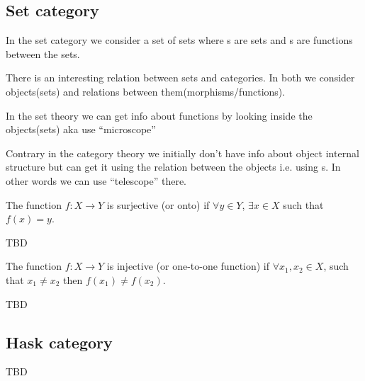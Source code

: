 \subsection{\textbf{Set} category}
\begin{example}
\label{ex:setcategory}
In the set category we consider a set of sets where
s are sets and s are
functions between the sets. 
\end{example}

\begin{remark}
\label{rem:set_vs_category}
There is an interesting relation between sets and categories. In both
we consider objects(sets) and relations between
them(morphisms/functions). 

In the set theory we can get info about functions by looking inside
the objects(sets) aka use ``microscope'' \cite{bib:milewski2018category} 

Contrary in the category theory we initially don't have info about object
internal structure but can get it using the relation between the
objects i.e. using s. In other words we can use
``telescope'' \cite{bib:milewski2018category}  there.
\end{remark}

\begin{definition}[Surjection]
  \label{def:surjection}
  The function $f: X \rightarrow Y$ is surjective (or onto) if
  $\forall y \in Y$, $\exists x \in X$ such that
  $f\left(x\right) = y$.
\end{definition}

\begin{remark}
\label{rem:surjection_epimorphism}
TBD
\end{remark}

\begin{definition}[Injection]
  \label{def:injection}
  The function $f: X \rightarrow Y$ is injective (or one-to-one function) if
  $\forall x_1, x_2 \in X$, such that $x_1 \ne x_2$ then
  $f\left(x_1\right) \ne f\left(x_2\right)$.
\end{definition}

\begin{remark}
\label{rem:injection_monomorphism}
TBD
\end{remark}


\subsection{\textbf{Hask} category}
TBD
